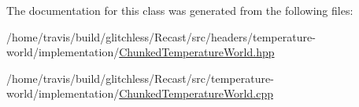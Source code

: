 The documentation for this class was generated from the following files\-:\begin{DoxyCompactItemize}
\item 
/home/travis/build/glitchless/\-Recast/src/headers/temperature-\/world/implementation/\hyperlink{_chunked_temperature_world_8hpp}{Chunked\-Temperature\-World.\-hpp}\item 
/home/travis/build/glitchless/\-Recast/src/temperature-\/world/implementation/\hyperlink{_chunked_temperature_world_8cpp}{Chunked\-Temperature\-World.\-cpp}\end{DoxyCompactItemize}
